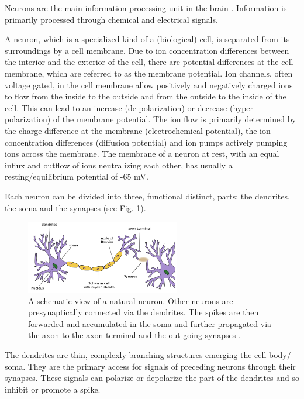 Neurons are the main information processing unit in the brain \cite{gerstner2014neuronal}\cite{Byrne1997}. 
Information is primarily processed through chemical and electrical signals.

A neuron, which is a specialized kind of a (biological) cell, is separated from its surroundings by a cell membrane.   
Due to ion concentration differences between the interior and the exterior of the cell, there are potential differences at the cell membrane, which are referred to as the membrane potential. 
Ion channels, often voltage gated, in the cell membrane allow positively and negatively charged ions to flow from the inside to the outside and from the outside to the inside of the cell.
This can lead to an increase (de-polarization) or decrease (hyper-polarization) of the membrane potential.
The ion flow is primarily determined by the charge difference at the membrane (electrochemical potential), the ion concentration differences (diffusion potential) and ion pumps actively pumping ions across the membrane.
The membrane of a neuron at rest, with an equal influx and outflow of ions neutralizing each other, has usually a resting/equilibrium potential of -65 mV. 

Each neuron can be divided into three, functional distinct, parts: the dendrites, the soma and the synapses (see Fig. \ref{fig:neuron}).

\begin{figure}[h]
	\centering
    	\includegraphics[width=0.6\textwidth]{imgs/neuron.png} 
    \caption[A schematic view of a natural neuron.]{A schematic view of a natural neuron. Other neurons are presynaptically connected via the dendrites. The spikes are then forwarded and accumulated in the soma and further propagated via the axon to the axon terminal and the out going synapses \cite{neuronImg}.}
	\label{fig:neuron}
\end{figure}

The dendrites are thin, complexly branching structures emerging the cell body/ soma.
They are the primary access for signals of preceding neurons through their synapses. 
These signals can polarize or depolarize the part of the dendrites and so inhibit or promote a spike. 

